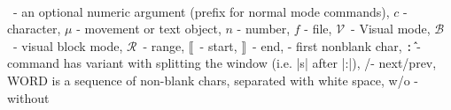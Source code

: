 \documentclass[10pt,a4paper,landscape]{article}
\newcommand{\ibeg}{$\llbracket$}
\newcommand{\iend}{$\rrbracket$}
\newcommand{\B}{{\footnotesize$\mathcal{B}$}}
\newcommand{\N}{{\footnotesize$\mathcal{N}$}}
\newcommand{\R}{{\footnotesize$\mathcal{R}$}}
\newcommand{\V}{{\footnotesize$\mathcal{V}$}}
\newcommand{\fst}{\ding{192}}
\newcommand{\next}{{\small\leftpointright}}
\newcommand{\prev}{{\small\rightpointleft}}
\newcommand{\spl}{ {\tt\^{:}} }
\begin{document}
\begin{multicols}{4}
\hrulefill \\
{\smaller\N~- an optional numeric argument (prefix for normal mode commands),
$c$ - character, $\mu$ - movement or text object, $n$ - number, $f$ - file,
\V~- Visual mode, \B~- visual block mode, \R~- range,
\ibeg~- start, \iend~- end, \fst - first nonblank char,
\spl - command has variant with splitting the window (i.e. |s| after |:|),
\next/\prev - next/prev, WORD is a sequence of non-blank chars, separated
with white space, w/o - without}
\end{multicols}
\end{document}
